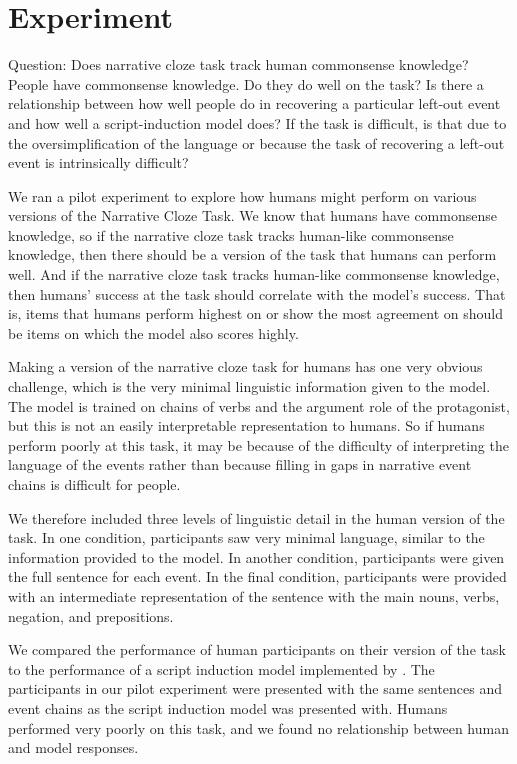 \documentclass[10pt,a4paper]{article}
\newcommand{\todo}[1]{{\color{red}#1}}
\begin{document}

\section{Experiment}

Question: Does narrative cloze task track human commonsense knowledge?
People have commonsense knowledge. Do they do well on the task?
Is there a relationship between how well people do in recovering a particular left-out event and how well a script-induction model does?
If the task is difficult, is that due to the oversimplification of the language or because the task of recovering a left-out event is intrinsically difficult?



We ran a pilot experiment to explore how humans might perform on various versions of the Narrative Cloze Task.
We know that humans have commonsense knowledge, so if the narrative cloze task tracks human-like commonsense knowledge, then there should be a version of the task that humans can perform well.
And if the narrative cloze task tracks human-like commonsense knowledge, then humans' success at the task should correlate with the model's success. That is, items that humans perform highest on or show the most agreement on should be items on which the model also scores highly.

Making a version of the narrative cloze task for humans has one very obvious challenge, which is the very minimal linguistic information given to the model.
The model is trained on chains of verbs and the argument role of the protagonist, but this is not an easily interpretable representation to humans. So if humans perform poorly at this task, it may be because of the difficulty of interpreting the language of the events rather than because filling in gaps in narrative event chains is difficult for people.

We therefore included three levels of linguistic detail in the human version of the task. In one condition, participants saw very minimal language, similar to the information provided to the model. In another condition, participants were given the full sentence for each event. In the final condition, participants were provided with an intermediate representation of the sentence with the main nouns, verbs, negation, and prepositions.

We compared the performance of human participants on their version of the task to the performance of a script induction model implemented by .
The participants in our pilot experiment were presented with the same sentences and event chains as the script induction model was presented with.
Humans performed very poorly on this task, and we found no relationship between human and model responses.
\end{document}
